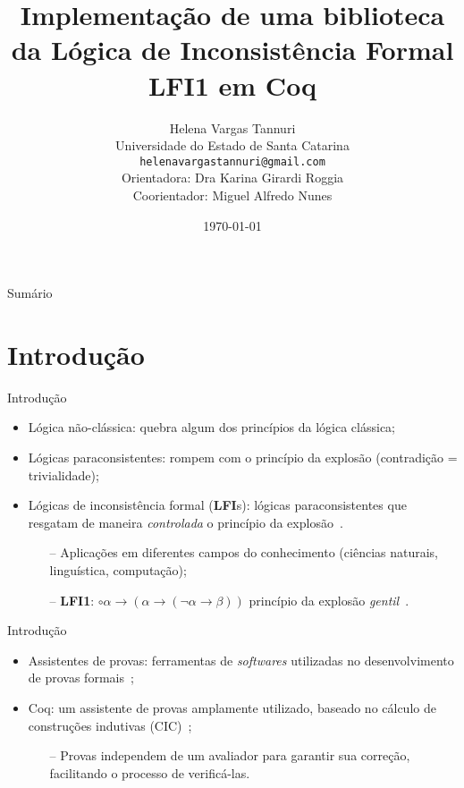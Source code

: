 \documentclass[xcolor=table]{beamer}
\title[]{Implementação de uma biblioteca da Lógica de Inconsistência Formal LFI1 em Coq}
\author[Helena Vargas Tannuri]{
    Helena Vargas Tannuri\\\smallskip
    {\scriptsize Universidade do Estado de Santa Catarina \\\smallskip
    \vspace{-2mm}
    \texttt{helenavargastannuri@gmail.com}\\\medskip
    {Orientadora: Dra Karina Girardi Roggia}\\
    {Coorientador: Miguel Alfredo Nunes}
    }
}
\date{\today}
\newcommand{\lfium}{{\normalfont\textbf{LFI1}}}
\newcommand{\lfis}{{\normalfont\textbf{LFI}s}}
\begin{document}
    \begin{frame}
        \titlepage
    \end{frame}

    \begin{frame}[allowframebreaks]{Sumário}
        \tableofcontents
    \end{frame}

\section[]{Introdução}
    \begin{frame}{Introdução}
        \begin{itemize}
            \item Lógica não-clássica: quebra algum dos princípios da lógica clássica;
            \item Lógicas paraconsistentes: rompem com o princípio da explosão (contradição = trivialidade);
            \item Lógicas de inconsistência formal (\lfis{}): lógicas paraconsistentes que resgatam de maneira \textit{controlada} o princípio da explosão~\cite{Carnielli_Coniglio_2016}.
            \begin{itemize}
                \item[--] Aplicações em diferentes campos do conhecimento (ciências naturais, linguística, computação);
                \item[--] \lfium{}: $\circ \alpha \to (\alpha \to (\neg \alpha \to \beta))$ princípio da explosão \textit{gentil}~\cite{carnielli2000formal}.
            \end{itemize}
        \end{itemize}
    \end{frame}

    \begin{frame}{Introdução}
        \begin{itemize}
            \item Assistentes de provas: ferramentas de \textit{softwares} utilizadas no desenvolvimento de provas formais~\cite{Chlipala_2013};
            \item Coq: um assistente de provas amplamente utilizado, baseado no cálculo de construções indutivas (CIC)~\cite{silva2019certificaccao};
            \begin{itemize}
                \item[--] Provas independem de um avaliador para garantir sua correção, facilitando o processo de verificá-las.
            \end{itemize}
        \end{itemize}
    \end{frame}
\end{document}
